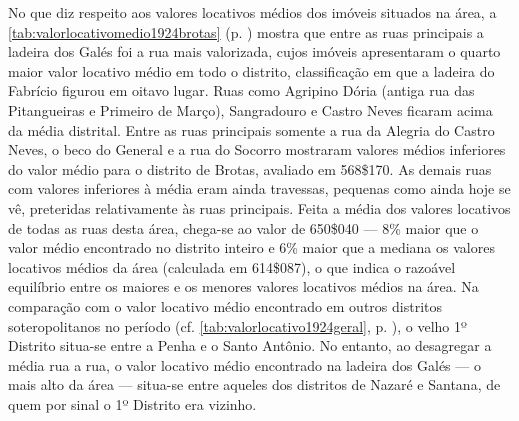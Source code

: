 No que diz respeito aos valores locativos médios dos imóveis situados na área, a \autoref{tab:valorlocativomedio1924brotas} (p. \pageref{tab:valorlocativomedio1924brotas}) mostra que entre as ruas principais a ladeira dos Galés foi a rua mais valorizada, cujos imóveis apresentaram o quarto maior valor locativo médio em todo o distrito, classificação em que a ladeira do Fabrício figurou em oitavo lugar. Ruas como Agripino Dória (antiga rua das Pitangueiras e Primeiro de Março), Sangradouro e Castro Neves ficaram acima da média distrital. Entre as ruas principais somente a rua da Alegria do Castro Neves, o beco do General e a rua do Socorro mostraram valores médios inferiores do valor médio para o distrito de Brotas, avaliado em 568\$170. As demais ruas com valores inferiores à média eram ainda travessas, pequenas como ainda hoje se vê, preteridas relativamente às ruas principais. Feita a média dos valores locativos de todas as ruas desta área, chega-se ao valor de 650\$040 --- 8\% maior que o valor médio encontrado no distrito inteiro e 6\% maior que a mediana os valores locativos médios da área (calculada em 614\$087), o que indica o razoável equilíbrio entre os maiores e os menores valores locativos médios na área. Na comparação com o valor locativo médio encontrado em outros distritos soteropolitanos no período (cf. \autoref{tab:valorlocativo1924geral}, p. \pageref{tab:valorlocativo1924geral}), o velho 1º Distrito situa-se entre a Penha e o Santo Antônio. No entanto, ao desagregar a média rua a rua, o valor locativo médio encontrado na ladeira dos Galés --- o mais alto da área --- situa-se entre aqueles dos distritos de Nazaré e Santana, de quem por sinal o 1º Distrito era vizinho.


